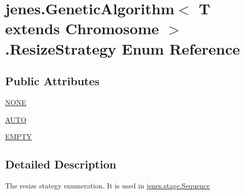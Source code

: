\hypertarget{enumjenes_1_1_genetic_algorithm_3_01_t_01extends_01_chromosome_01_4_1_1_resize_strategy}{\section{jenes.\-Genetic\-Algorithm$<$ T extends Chromosome $>$.Resize\-Strategy Enum Reference}
\label{enumjenes_1_1_genetic_algorithm_3_01_t_01extends_01_chromosome_01_4_1_1_resize_strategy}
}
\subsection*{Public Attributes}
\begin{DoxyCompactItemize}
\item 
\hyperlink{enumjenes_1_1_genetic_algorithm_3_01_t_01extends_01_chromosome_01_4_1_1_resize_strategy_a2efbc067403542b53491c6ca5d3200fe}{N\-O\-N\-E}
\item 
\hyperlink{enumjenes_1_1_genetic_algorithm_3_01_t_01extends_01_chromosome_01_4_1_1_resize_strategy_ab5fbe0d69a54b0b5286d2231726934e5}{A\-U\-T\-O}
\item 
\hyperlink{enumjenes_1_1_genetic_algorithm_3_01_t_01extends_01_chromosome_01_4_1_1_resize_strategy_a69a9defbff3c22d92a210f7a72646869}{E\-M\-P\-T\-Y}
\end{DoxyCompactItemize}


\subsection{Detailed Description}
The resize stategy enumeration. It is used in \hyperlink{}{jenes.\-stage.\-Sequence}

